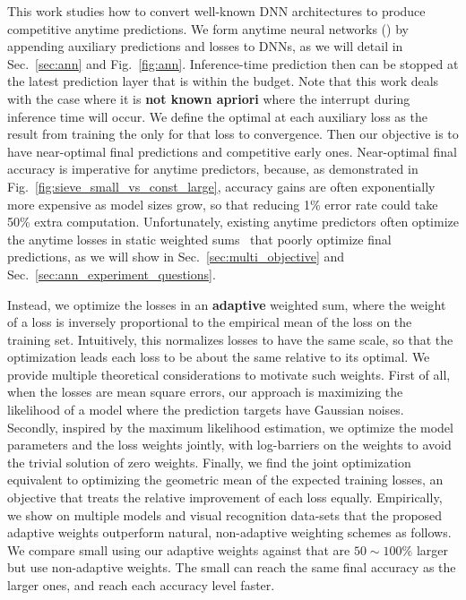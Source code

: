 This work studies how to convert well-known DNN architectures to produce competitive anytime predictions.  
We form anytime neural networks (\anns) by appending auxiliary predictions and losses to DNNs, as we will detail in Sec.~\ref{sec:ann} and Fig.~\ref{fig:ann}. Inference-time prediction then can be stopped at the latest prediction layer that is within the budget. Note that this work deals with the case where it is \textbf{not known apriori} where the interrupt during inference time will occur. 
We define the optimal at each auxiliary loss as the result from training the \ann only for that loss to convergence. Then our objective is to have near-optimal final predictions and competitive early ones.  Near-optimal final accuracy is imperative for anytime predictors, because, as demonstrated in Fig.~\ref{fig:sieve_small_vs_const_large}, accuracy gains are often exponentially more expensive as model sizes grow, so that reducing 1\% error rate could take 50\% extra computation. Unfortunately, existing anytime predictors often optimize the anytime losses in static weighted sums~\cite{supervisednet,feedbacknet,msdense} that poorly optimize final predictions, as we will show in Sec.~\ref{sec:multi_objective} and Sec.~\ref{sec:ann_experiment_questions}.

Instead, we optimize the losses in an \textbf{adaptive} weighted sum, where the weight of a loss is inversely proportional to the empirical mean of the loss on the training set. Intuitively, this normalizes losses to have the same scale, so that the optimization leads each loss to be about the same relative to its optimal. We provide multiple theoretical considerations to motivate such weights.
First of all, when the losses are mean square errors, our approach is maximizing the likelihood of a model where the prediction targets have Gaussian noises. Secondly, inspired by the maximum likelihood estimation, we optimize the model parameters and the loss weights jointly, with log-barriers on the weights to avoid the trivial solution of zero weights. Finally, we find the joint optimization equivalent to optimizing the geometric mean of the expected training losses, an objective that treats the relative improvement of each loss equally. Empirically, we show on multiple models and visual recognition data-sets that the proposed adaptive weights outperform natural, non-adaptive weighting schemes as follows.
We compare small \anns using our adaptive weights against \anns that are $50\sim 100\%$ larger but use non-adaptive weights. The small \anns can reach the same final accuracy as the larger ones, and reach each accuracy level faster.

